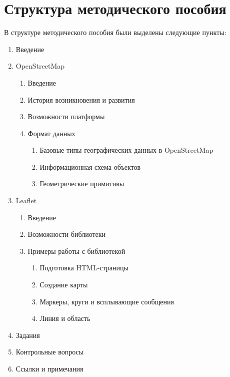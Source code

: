 \documentclass[a4paper, 14pt]{extreport}
\begin{document}
    \chapter{Структура методического пособия}
    В структуре методического пособия были выделены следующие пункты:
    \begin{enumerate}
        \item Введение
        \item OpenStreetMap
        \begin{enumerate}
            \item Введение
            \item История возникновения и развития
            \item Возможности платформы
            \item Формат данных
            \begin{enumerate}
                \item Базовые типы географических данных в OpenStreetMap
                \item Информационная схема объектов
                \item Геометрические примитивы
            \end{enumerate}
        \end{enumerate}
        \item Leaflet
        \begin{enumerate}
            \item Введение
            \item Возможности библиотеки
            \item Примеры работы с библиотекой
            \begin{enumerate}
                \item Подготовка HTML-страницы
                \item Создание карты
                \item Маркеры, круги и всплывающие сообщения
                \item Линия и область
            \end{enumerate}
        \end{enumerate}
        \item Задания
        \item Контрольные вопросы
        \item Ссылки и примечания
    \end{enumerate}

    \newpage
\end{document}
